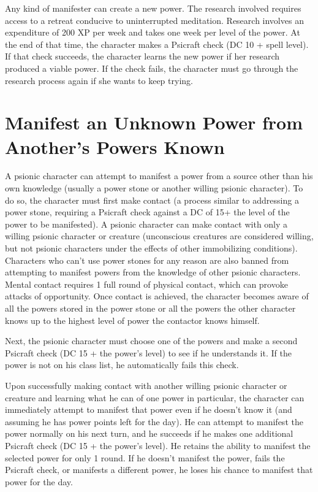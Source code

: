 \documentclass{article}
\begin{document}
Any kind of manifester can create a new power. The research involved requires access 
to a retreat conducive to uninterrupted meditation. Research involves an expenditure 
of 200 XP per week and takes one week per level of the power. At the end of that 
time, the character makes a Psicraft check (DC 10 + spell level). If that check 
succeeds, the character learns the new power if her research produced a viable 
power. If the check fails, the character must go through the research process again 
if she wants to keep trying.

\section*{\textbf{Manifest an Unknown Power from Another's Powers Known}}

A psionic character can attempt to manifest a power from a source other than his 
own knowledge (usually a power stone or another willing psionic character). To 
do so, the character must first make contact (a process similar to addressing a 
power stone, requiring a Psicraft check against a DC of 15+ the level of the power 
to be manifested). A psionic character can make contact with only a willing psionic 
character or creature (unconscious creatures are considered willing, but not psionic 
characters under the effects of other immobilizing conditions). Characters who 
can't use power stones for any reason are also banned from attempting to manifest 
powers from the knowledge of other psionic characters. Mental contact requires 
1 full round of physical contact, which can provoke attacks of opportunity. Once 
contact is achieved, the character becomes aware of all the powers stored in the 
power stone or all the powers the other character knows up to the highest level 
of power the contactor knows himself. 

Next, the psionic character must choose one of the powers and make a second Psicraft 
check (DC 15 + the power's level) to see if he understands it. If the power is 
not on his class list, he automatically fails this check.

Upon successfully making contact with another willing psionic character or creature 
and learning what he can of one power in particular, the character can immediately 
attempt to manifest that power even if he doesn't know it (and assuming he has 
power points left for the day). He can attempt to manifest the power normally on 
his next turn, and he succeeds if he makes one additional Psicraft check (DC 15 
+ the power's level). He retains the ability to manifest the selected power for 
only 1 round. If he doesn't manifest the power, fails the Psicraft check, or manifests 
a different power, he loses his chance to manifest that power for the day.
\end{document}
